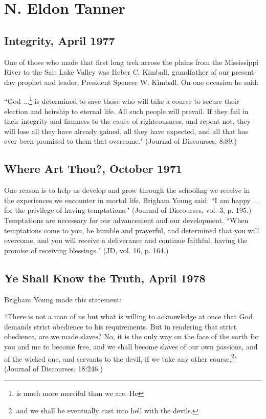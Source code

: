 \section{N. Eldon Tanner}

\subsection{Integrity, April 1977}

One of those who made that first long trek across the plains from the Mississippi River to the Salt Lake Valley was Heber C. Kimball, grandfather of our present-day prophet and leader, President Spencer W. Kimball. On one occasion he said:

``God ...\footnote{is much more merciful than we are. He} is determined to save those who will take a course to secure their election and heirship to eternal life. All such people will prevail. If they fail in their integrity and firmness to the cause of righteousness, and repent not, they will lose all they have already gained, all they have expected, and all that has ever been promised to them that overcome." (Journal of Discourses, 8:89.)

\subsection{Where Art Thou?, October 1971}

One reason is to help us develop and grow through the schooling we receive in the experiences we encounter in mortal life. Brigham Young said: ``I am happy ... for the privilege of having temptations." (Journal of Discourses, vol. 3, p. 195.) Temptations are necessary for our advancement and our development. ``When temptations come to you, be humble and prayerful, and determined that you will overcome, and you will receive a deliverance and continue faithful, having the promise of receiving blessings." (JD, vol. 16, p. 164.)

\subsection{Ye Shall Know the Truth, April 1978}

Brigham Young made this statement:

``There is not a man of us but what is willing to acknowledge at once that God demands strict obedience to his requirements. But in rendering that strict obedience, are we made slaves? No, it is the only way on the face of the earth for you and me to become free, and we shall become slaves of our own passions, and of the wicked one, and servants to the devil, if we take any other course.\footnote{and we shall be eventually cast into hell with the devils.}" (Journal of Discourses, 18:246.)